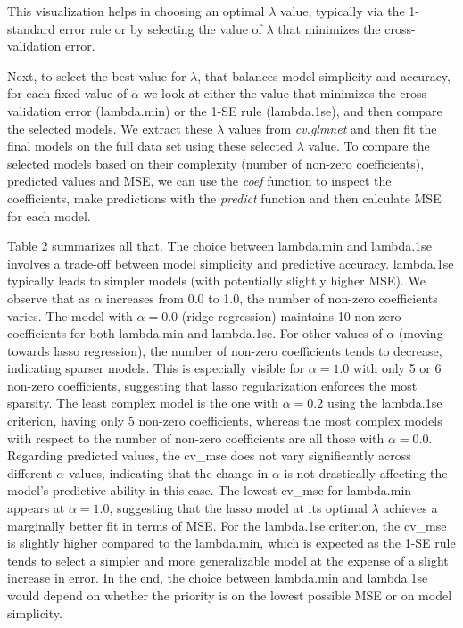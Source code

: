 \documentclass[
]{article}
\begin{document}
This visualization helps in choosing an optimal \(\lambda\) value,
typically via the 1-standard error rule or by selecting the value of
\(\lambda\) that minimizes the cross-validation error.

Next, to select the best value for \(\lambda\), that balances model
simplicity and accuracy, for each fixed value of \(\alpha\) we look at
either the value that minimizes the cross-validation error (lambda.min)
or the 1-SE rule (lambda.1se), and then compare the selected models. We
extract these \(\lambda\) values from \textit{cv.glmnet} and then fit
the final models on the full data set using these selected \(\lambda\)
value. To compare the selected models based on their complexity (number
of non-zero coefficients), predicted values and MSE, we can use the
\textit{coef} function to inspect the coefficients, make predictions
with the \textit{predict} function and then calculate MSE for each
model.

Table 2 summarizes all that. The choice between lambda.min and
lambda.1se involves a trade-off between model simplicity and predictive
accuracy. lambda.1se typically leads to simpler models (with potentially
slightly higher MSE). We observe that as \(\alpha\) increases from 0.0
to 1.0, the number of non-zero coefficients varies. The model with
\(\alpha = 0.0\) (ridge regression) maintains 10 non-zero coefficients
for both lambda.min and lambda.1se. For other values of \(\alpha\)
(moving towards lasso regression), the number of non-zero coefficients
tends to decrease, indicating sparser models. This is especially visible
for \(\alpha = 1.0\) with only 5 or 6 non-zero coefficients, suggesting
that lasso regularization enforces the most sparsity. The least complex
model is the one with \(\alpha = 0.2\) using the lambda.1se criterion,
having only 5 non-zero coefficients, whereas the most complex models
with respect to the number of non-zero coefficients are all those with
\(\alpha = 0.0\). Regarding predicted values, the cv\_mse does not vary
significantly across different \(\alpha\) values, indicating that the
change in \(\alpha\) is not drastically affecting the model's predictive
ability in this case. The lowest cv\_mse for lambda.min appears at
\(\alpha = 1.0\), suggesting that the lasso model at its optimal
\(\lambda\) achieves a marginally better fit in terms of MSE. For the
lambda.1se criterion, the cv\_mse is slightly higher compared to the
lambda.min, which is expected as the 1-SE rule tends to select a simpler
and more generalizable model at the expense of a slight increase in
error. In the end, the choice between lambda.min and lambda.1se would
depend on whether the priority is on the lowest possible MSE or on model
simplicity.
\end{document}
